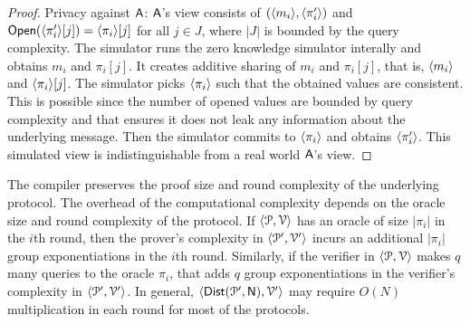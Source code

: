 \begin{proof}
	Privacy against $\mathsf{A}$: $\mathsf{A}$'s view consists of $(\langle m_i \rangle, \langle \pi'_i \rangle)$ and $\mathsf{Open}(\langle \pi'_i \rangle[j]) = \langle \pi_i \rangle[j]$ for all $j \in J$, where $|J|$ is bounded by the query complexity. 
	The simulator runs the zero knowledge simulator interally and obtains $m_i$ and $\pi_i[j]$. It creates additive sharing of $m_i$ and $\pi_i[j]$, that is, $\langle m_i \rangle$ and $\langle \pi_i \rangle[j]$. The simulator picks $\langle \pi_i \rangle$ such that the obtained values are consistent. This is possible since the number of opened values are bounded by query complexity and that ensures it does not leak any information about the underlying message. Then the simulator commits to $\langle \pi_i \rangle$ and obtains $\langle \pi'_i \rangle$. This simulated view is indistinguishable from a real world $\mathsf{A}$'s view.
\end{proof}

The compiler preserves the proof size and round complexity of the underlying protocol. The overhead of the computational complexity depends on the oracle size and round complexity of the protocol. If $\langle \mathcal{P},\mathcal{V}\rangle$ has an oracle of size $|\pi_i|$ in the $i$th round, then the prover's complexity in $\langle \mathcal{P}',\mathcal{V}'\rangle$ incurs an additional $|\pi_i|$ group exponentiations in the $i$th round. Similarly, if the verifier in $\langle \mathcal{P},\mathcal{V}\rangle$ makes $q$ many queries to the oracle $\pi_i$, that adds $q$ group exponentiations in the verifier's complexity in $\langle \mathcal{P}',\mathcal{V}'\rangle$. In general, $\langle \mathsf{Dist}(\mathcal{P}', \mathsf{N}),\mathcal{V}'\rangle$ may require $O(N)$ multiplication in each round for most of the protocols.








